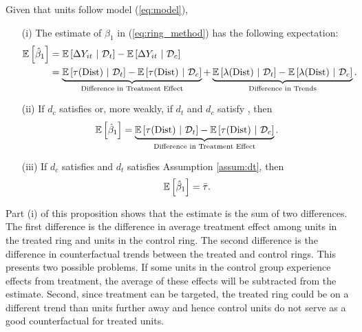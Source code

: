 \documentclass[10pt]{article}
\newcommand{\dist}{\text{Dist}}
\begin{document}
\begin{proposition}\label{prop:ring_decomp}  
    Given that units follow model (\ref{eq:model}),
    \begin{enumerate}
        \item[(i)] The estimate of $\beta_1$ in (\ref{eq:ring_method}) has the following expectation:
        \begin{align*}
            \expec{\hat{\beta}_1} &= \condexpec{\Delta Y_{it}}{\mathcal{D}_t} - \condexpec{\Delta Y_{it}}{\mathcal{D}_c} \\
            &=  \underbrace{\condexpec{\tau(\dist)}{\mathcal{D}_t} - \condexpec{\tau(\dist)}{\mathcal{D}_c} }_{\text{Difference in Treatment Effect}} + \underbrace{\condexpec{\lambda(\dist)}{\mathcal{D}_t} - \condexpec{\lambda(\dist)}{\mathcal{D}_c} }_{\text{Difference in Trends}}.
        \end{align*}
        
        \item[(ii)] If $d_c$ satisfies  or, more weakly, if $d_t$ and $d_c$ satisfy , then
        \[ 
            \expec{\hat{\beta}_1} = 
            \underbrace{\condexpec{\tau(\dist)}{\mathcal{D}_t} - \condexpec{\tau(\dist)}{\mathcal{D}_c} }_{\text{Difference in Treatment Effect}}.
        \] 
    
        \item[(iii)] If $d_c$ satisfies  and $d_t$ satisfies Assumption \ref{assum:dt}, then
        \[ 
            \mathbb{E}\left[\hat{\beta}_1\right] = \bar{\tau}.
        \]
    \end{enumerate}
\end{proposition}

Part (i) of this proposition shows that the estimate is the sum of two differences. The first difference is the difference in average treatment effect among units in the treated ring and units in the control ring. The second difference is the difference in counterfactual trends between the treated and control rings. This presents two possible problems. If some units in the control group experience effects from treatment, the average of these effects will be subtracted from the estimate. Second, since treatment can be targeted, the treated ring could be on a different trend than units further away and hence control units do not serve as a good counterfactual for treated units.
\end{document}
